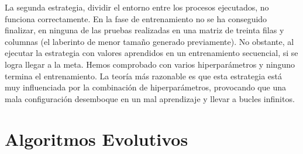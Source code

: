 		\newpage
		
		La segunda estrategia, dividir el entorno entre los procesos ejecutados, no funciona correctamente. En la fase de entrenamiento no se ha conseguido finalizar, en ninguna de las pruebas realizadas en una matriz de treinta filas y columnas (el laberinto de menor tamaño generado previamente). No obstante, al ejecutar la estrategia con valores aprendidos en un entrenamiento secuencial, si se logra llegar a la meta. Hemos comprobado con varios hiperparámetros y ninguno termina el entrenamiento. La teoría más razonable es que esta estrategia está muy influenciada por la combinación de hiperparámetros, provocando que una mala configuración desemboque en un mal aprendizaje y llevar a bucles infinitos.
				
		
		
	
		
	
		

\section{Algoritmos Evolutivos}

